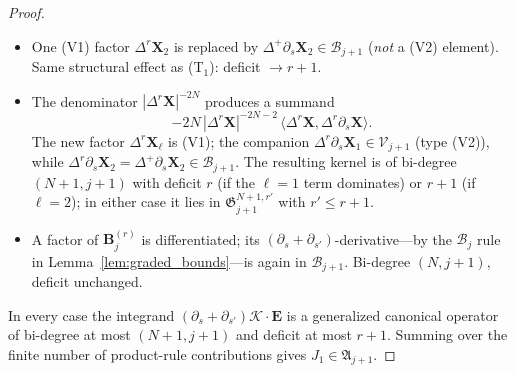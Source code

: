 \documentclass{amsart}
\begin{document}
\begin{proof}
\begin{itemize}
\item[(T$_3$)] One (V1) factor $\Delta^r\mathbf{X}_2$ is replaced by $\Delta^+\partial_s\mathbf{X}_2 \in \mathcal{B}_{j+1}$ (\emph{not} a (V2) element).  Same structural effect as (T$_1$): deficit $\to r+1$.

\item[(T$_4$)] The denominator $|\Delta^r\mathbf{X}|^{-2N}$ produces a summand
\[
-2N\,|\Delta^r\mathbf{X}|^{-2N-2}\,\langle\Delta^r\mathbf{X},\Delta^r\partial_s\mathbf{X}\rangle.
\]
The new factor $\Delta^r\mathbf{X}_\ell$ is (V1); the companion $\Delta^r\partial_s\mathbf{X}_1 \in \mathcal{V}_{j+1}$ (type (V2)), while $\Delta^r\partial_s\mathbf{X}_2 = \Delta^+\partial_s\mathbf{X}_2 \in \mathcal{B}_{j+1}$.  The resulting kernel is of bi-degree $(N+1, j+1)$ with deficit $r$ (if the $\ell = 1$ term dominates) or $r+1$ (if $\ell = 2$); in either case it lies in $\mathfrak{G}_{j+1}^{N+1, r'}$ with $r' \le r+1$.

\item[(T$_5$)] A factor of $\mathbf{B}_j^{(r)}$ is differentiated; its $(\partial_s+\partial_{s'})$-derivative—by the $\mathcal{B}_j$ rule in Lemma~\ref{lem:graded_bounds}—is again in $\mathcal{B}_{j+1}$.  Bi-degree $(N, j+1)$, deficit unchanged.
\end{itemize}
In every case the integrand $(\partial_s+\partial_{s'})\mathcal{K}\cdot\mathbf{E}$ is a generalized canonical operator of bi-degree at most $(N+1, j+1)$ and deficit at most $r+1$.  Summing over the finite number of product-rule contributions gives $J_1 \in \mathfrak{A}_{j+1}$.


\end{proof}
\end{document}
